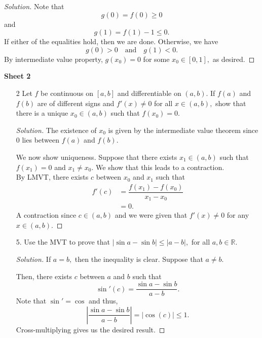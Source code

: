 \documentclass[12pt]{article}
\theoremstyle{definition}
\newenvironment{soln}{\begin{proof}[Solution]}{\end{proof}}
\begin{document}
\begin{itemize}
\begin{soln}
		Note that
		\begin{equation*} 
			g(0) = f(0) \ge 0
		\end{equation*}
		and
		\begin{equation*} 
			g(1) = f(1) - 1 \le 0.
		\end{equation*}
		If either of the equalities hold, then we are done. Otherwise, we have
		\begin{equation*} 
			g(0) > 0 \quad\text{and}\quad g(1) < 0.
		\end{equation*}
		By intermediate value property, $g(x_0) = 0$ for some $x_0 \in [0, 1],$ as desired.	
	\end{soln}
\end{itemize}	
\newpage
\textbf{Sheet 2}
\begin{itemize}
	\item[2] Let $f$ be continuous on $[a, b]$ and differentiable on $(a, b).$ If $f(a)$ and $f(b)$ are of different signs and $f'(x) \neq 0$ for all $x \in (a, b),$ show that there is a unique $x_0 \in (a, b)$ such that $f(x_0) = 0.$
	\begin{soln}
		The existence of $x_0$ is given by the intermediate value theorem since $0$ lies between $f(a)$ and $f(b).$

		We now show uniqueness. Suppose that there exists $x_1 \in (a, b)$ such that $f(x_1) = 0$ and $x_1 \neq x_0.$ We show that this leads to a contraction. \\
		By LMVT, there exists $c$ between $x_0$ and $x_1$ such that
		\begin{align*} 
			f'(c) &= \dfrac{f(x_1) - f(x_0)}{x_1 - x_0}\\
			&= 0.
		\end{align*}
		A contraction since $c \in (a, b)$ and we were given that $f'(x) \neq 0$ for any $x \in (a, b).$
	\end{soln}
	\newpage
	\item[5.] Use the MVT to prove that $\left|\sin a - \sin b\right| \le |a - b|,$ for all $a, b \in \mathbb{R}.$
	\begin{soln}
	 	If $a = b,$ then the inequality is clear. Suppose that $a \neq b.$

	 	Then, there exists $c$ between $a$ and $b$ such that
	 	\begin{equation*} 
	 		\sin'(c) = \dfrac{\sin a - \sin b}{a - b}.
	 	\end{equation*}
	 	Note that $\sin' = \cos$ and thus,
	 	\begin{equation*} 
	 		\left|\dfrac{\sin a - \sin b}{a - b}\right| = \left|\cos(c)\right| \le 1.
	 	\end{equation*}
	 	Cross-multiplying gives us the desired result.
	\end{soln} 
\end{itemize}
%
%
%
\end{document}
